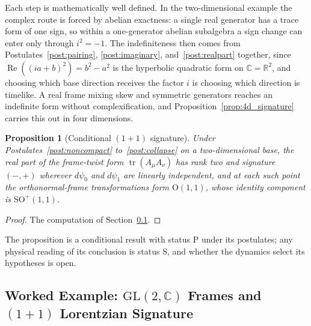 \documentclass[11pt]{article}
\newtheorem{proposition}{Proposition}
\begin{document}
Each step is mathematically well defined. In the two-dimensional example the complex route is forced by abelian exactness: a single real generator has a trace form of one sign, so within a one-generator abelian subalgebra a sign change can enter only through $i^2 = -1$. The indefiniteness then comes from Postulates~\ref{post:pairing}, \ref{post:imaginary}, and~\ref{post:realpart} together, since $\operatorname{Re}((ia+b)^2) = b^2 - a^2$ is the hyperbolic quadratic form on $\mathbb{C} = \mathbb{R}^2$, and choosing which base direction receives the factor $i$ is choosing which direction is timelike. A real frame mixing skew and symmetric generators reaches an indefinite form without complexification, and Proposition~\ref{prop:4d_signature} carries this out in four dimensions.

\begin{proposition}[Conditional $(1{+}1)$ signature]\label{prop:conditional_signature}
Under Postulates~\ref{post:noncompact} to~\ref{post:collapse} on a two-dimensional base, the real part of the frame-twist form $\operatorname{tr}(A_\mu A_\nu)$ has rank two and signature $(-,+)$ wherever $d\psi_0$ and $d\psi_1$ are linearly independent, and at each such point the orthonormal-frame transformations form $\mathrm{O}(1,1)$, whose identity component is $\mathrm{SO}^+(1,1)$.
\end{proposition}
\begin{proof}
The computation of Section~\ref{sec:worked_signature}.
\end{proof}
The proposition is a conditional result with status P under its postulates; any physical reading of its conclusion is status S, and whether the dynamics select its hypotheses is open.

\subsection{Worked Example: \texorpdfstring{$\mathrm{GL}(2,\mathbb{C})$}{GL(2,C)} Frames and \texorpdfstring{$(1{+}1)$}{(1+1)} Lorentzian Signature}
\label{sec:worked_signature}
\end{document}
